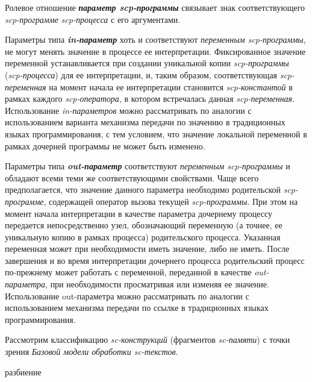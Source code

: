 Ролевое отношение \textbf{\textit{параметр scp-программы\scnrolesign}} связывает знак соответствующего \textit{scp-программе} \textit{\mbox{scp-процесса}} с его аргументами.

Параметры типа \textbf{\textit{in-параметр\scnrolesign}} хоть и соответствуют \textit{переменным scp-программы\scnrolesign}, не могут менять значение в процессе ее интерпретации. Фиксированное значение переменной устанавливается при создании уникальной копии \textit{scp-программы} (\textit{scp-процесса}) для ее интерпретации, и, таким образом, соответствующая \textit{scp-переменная\scnrolesign} на момент начала ее интерпретации становится \textit{scp-константой\scnrolesign} в рамках каждого \textit{scp-оператора}, в котором встречалась данная \textit{scp-переменная\scnrolesign}. Использование \textit{in-параметров} можно рассматривать по аналогии с использованием варианта механизма передачи по значению в традиционных языках программирования, с тем условием, что значение локальной переменной в рамках дочерней программы не может быть изменено.

Параметры типа \textbf{\textit{out-параметр\scnrolesign}} соответствуют \textit{переменным scp-программы\scnrolesign} и обладают всеми теми же соответствующими свойствами. Чаще всего предполагается, что значение данного параметра необходимо родительской \textit{scp-программе}, содержащей оператор вызова текущей \textit{scp-программы}. При этом на момент начала интерпретации в качестве параметра дочернему процессу передается непосредственно узел, обозначающий переменную (а точнее, ее уникальную копию в рамках процесса) родительского процесса. Указанная переменная может при необходимости иметь значение, либо не иметь. После завершения и во время интерпретации дочернего процесса родительский процесс по-прежнему может работать с переменной, переданной в качестве \textit{out-параметра\scnrolesign}, при необходимости просматривая или изменяя ее значение. Использование out-параметра можно рассматривать по аналогии с использованием механизма передачи по ссылке в традиционных языках программирования.

Рассмотрим классификацию \textit{sc-конструкций} (фрагментов \textit{sc-памяти}) с точки зрения \textit{Базовой модели обработки sc-текстов}.

\begin{SCn}
\begin{scnindent}
	\begin{scneqtoset}
	\end{scneqtoset}
\begin{scnindent}
\begin{scnrelfromset}{разбиение}
\end{scnrelfromset}
\end{scnindent}
\end{scnindent}
\end{SCn}

